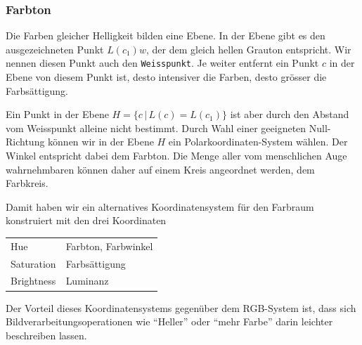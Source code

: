 \subsubsection{Farbton}
Die Farben gleicher Helligkeit bilden eine Ebene. In der Ebene gibt es
den ausgezeichneten Punkt $L(c_1)w$, der dem gleich hellen Grauton
entspricht. Wir nennen diesen Punkt auch den {\tt Weisspunkt}.
Je weiter entfernt ein Punkt $c$ in der Ebene von diesem
Punkt ist, desto intensiver die Farben, desto grösser die Farbsättigung.

Ein Punkt in der Ebene $H=\{c\,|\, L(c)=L(c_1)\}$ ist aber durch
den Abstand vom Weisspunkt alleine nicht bestimmt. Durch Wahl einer 
geeigneten Null-Richtung können wir in der Ebene $H$ ein
Polarkoordinaten-System wählen. Der Winkel entspricht dabei dem
Farbton.
Die Menge aller vom menschlichen Auge wahrnehmbaren können daher
auf einem Kreis angeordnet werden, dem Farbkreis.

Damit haben wir ein alternatives Koordinatensystem für den Farbraum
konstruiert mit den drei Koordinaten
\begin{center}
\begin{tabular}{l|l}
\hline
Hue&Farbton, Farbwinkel\\
Saturation&Farbsättigung\\
Brightness&Luminanz\\
\hline
\end{tabular}
\end{center}
Der Vorteil dieses Koordinatensystems gegenüber dem RGB-System ist,
dass sich Bildverarbeitungsoperationen wie ``Heller'' oder ``mehr Farbe''
darin leichter beschreiben lassen.
